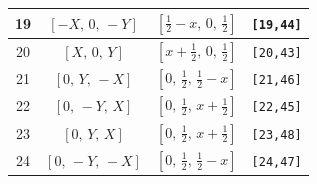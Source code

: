 \documentclass[fleqn,8pt]{jsarticle}
\begin{document}
\begin{longtable}{cccc}
19 & $\left[ - X,\, 0,\, - Y \right]$ & $\left[ \frac{1}{2} - x,\, 0,\, \frac{1}{2} \right]$ & {\tt [19,44]} \\ \hline
20 & $\left[ X,\, 0,\, Y \right]$ & $\left[ x + \frac{1}{2},\, 0,\, \frac{1}{2} \right]$ & {\tt [20,43]} \\ \hline
21 & $\left[ 0,\, Y,\, - X \right]$ & $\left[ 0,\, \frac{1}{2},\, \frac{1}{2} - x \right]$ & {\tt [21,46]} \\ \hline
22 & $\left[ 0,\, - Y,\, X \right]$ & $\left[ 0,\, \frac{1}{2},\, x + \frac{1}{2} \right]$ & {\tt [22,45]} \\ \hline
23 & $\left[ 0,\, Y,\, X \right]$ & $\left[ 0,\, \frac{1}{2},\, x + \frac{1}{2} \right]$ & {\tt [23,48]} \\ \hline
24 & $\left[ 0,\, - Y,\, - X \right]$ & $\left[ 0,\, \frac{1}{2},\, \frac{1}{2} - x \right]$ & {\tt [24,47]} \\
\end{longtable}
\renewcommand{\arraystretch}{1.2}
\end{document}
